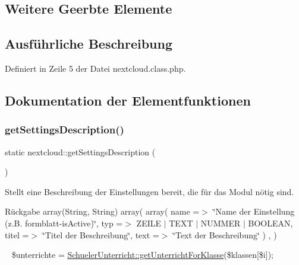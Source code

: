 \subsection*{Weitere Geerbte Elemente}


\subsection{Ausführliche Beschreibung}


Definiert in Zeile 5 der Datei nextcloud.\+class.\+php.



\subsection{Dokumentation der Elementfunktionen}
\mbox{\label{classnextcloud_a97fe0ca8c7e3e973b531c315ffc17856}} 
\subsubsection{\texorpdfstring{get\+Settings\+Description()}{getSettingsDescription()}}
{\footnotesize\ttfamily static nextcloud\+::get\+Settings\+Description (\begin{DoxyParamCaption}{ }\end{DoxyParamCaption})\hspace{0.3cm}{\ttfamily [static]}}

Stellt eine Beschreibung der Einstellungen bereit, die für das Modul nötig sind. \begin{DoxyReturn}{Rückgabe}
array(\+String, String) array( array( \textquotesingle{}name\textquotesingle{} =$>$ \char`\"{}\+Name der Einstellung (z.\+B. formblatt-\/is\+Active)\char`\"{}, \textquotesingle{}typ\textquotesingle{} =$>$ Z\+E\+I\+LE $\vert$ T\+E\+XT $\vert$ N\+U\+M\+M\+ER $\vert$ B\+O\+O\+L\+E\+AN, \textquotesingle{}titel\textquotesingle{} =$>$ \char`\"{}\+Titel der Beschreibung\char`\"{}, \textquotesingle{}text\textquotesingle{} =$>$ \char`\"{}\+Text der Beschreibung\char`\"{} ) , ) 
\end{DoxyReturn}
~\newline
\$unterrichte = \mbox{\hyperlink{class_schueler_unterricht_a7d858e9aa456de9903063c17c7b1f1cd}{Schueler\+Unterricht\+::get\+Unterricht\+For\+Klasse}}(\$klassen\mbox{[}\$i\mbox{]});

